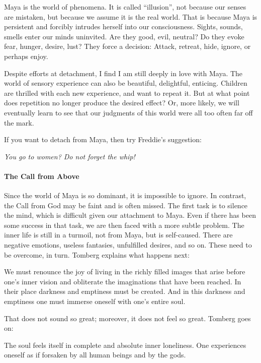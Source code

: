 Maya is the world of phenomena. It is called ``illusion'', not because our senses are mistaken, but because we assume it is the real world. That is because Maya is persistent and forcibly intrudes herself into our consciousness. Sights, sounds, smells enter our minds uninvited. Are they good, evil, neutral? Do they evoke fear, hunger, desire, lust? They force a decision: Attack, retreat, hide, ignore, or perhaps enjoy.

Despite efforts at detachment, I find I am still deeply in love with Maya. The world of sensory experience can also be beautiful, delightful, enticing. Children are thrilled with each new experience, and want to repeat it. But at what point does repetition no longer produce the desired effect? Or, more likely, we will eventually learn to see that our judgments of this world were all too often far off the mark.

If you want to detach from Maya, then try Freddie's suggestion:

\emph{You go to women? Do not forget the whip!}


\paragraph{The Call from Above}


Since the world of Maya is so dominant, it is impossible to ignore. In contrast, the Call from God may be faint and is often missed. The first task is to silence the mind, which is difficult given our attachment to Maya. Even if there has been some success in that task, we are then faced with a more subtle problem. The inner life is still in a turmoil, not from Maya, but is self-caused. There are negative emotions, useless fantasies, unfulfilled desires, and so on. These need to be overcome, in turn. Tomberg explains what happens next:

\begin{quotex}
We must renounce the joy of living in the richly filled images that arise before one's inner vision and obliterate the imaginations that have been reached. In their place darkness and emptiness must be created. And in this darkness and emptiness one must immerse oneself with one's entire soul.
\end{quotex}


That does not sound so great; moreover, it does not feel so great. Tomberg goes on:

\begin{quotex}
The soul feels itself in complete and absolute inner loneliness. One experiences oneself as if forsaken by all human beings and by the gods.
\end{quotex}


